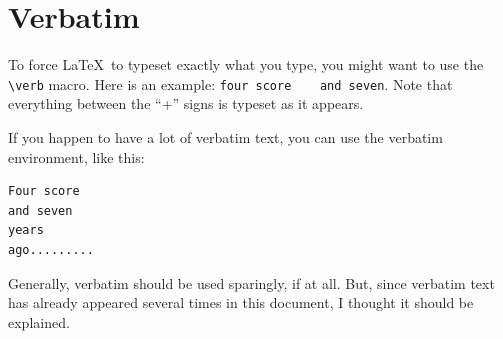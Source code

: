 \section{Verbatim}

To force \LaTeX\ to typeset exactly what you type, you might want to use the \verb+\verb+
macro. Here is an example:
\verb+four score    and seven+. Note that everything between the ``+'' signs
is typeset as it appears. 

If you happen to have a lot of verbatim text, you can use the verbatim environment,
like this:

\begin{verbatim}
Four score
and seven
years
ago.........
\end{verbatim}

Generally, verbatim should be used sparingly, if at all. But, since
verbatim text has already appeared several times in this document, I thought it
should be explained.

